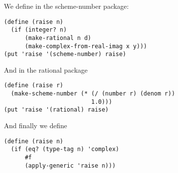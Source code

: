 \documentclass[a4paper,12pt]{article}
\begin{document}
We define in the scheme-number package:
\begin{lstlisting}
(define (raise n)
  (if (integer? n)
      (make-rational n d)
      (make-complex-from-real-imag x y)))
(put 'raise '(scheme-number) raise)
\end{lstlisting}
And in the rational package
\begin{lstlisting}
(define (raise r)
  (make-scheme-number (* (/ (number r) (denom r))
                         1.0)))
(put 'raise '(rational) raise)
\end{lstlisting}
And finally we define
\begin{lstlisting}
(define (raise n)
  (if (eq? (type-tag n) 'complex)
      #f
      (apply-generic 'raise n)))
\end{lstlisting}
\end{document}
